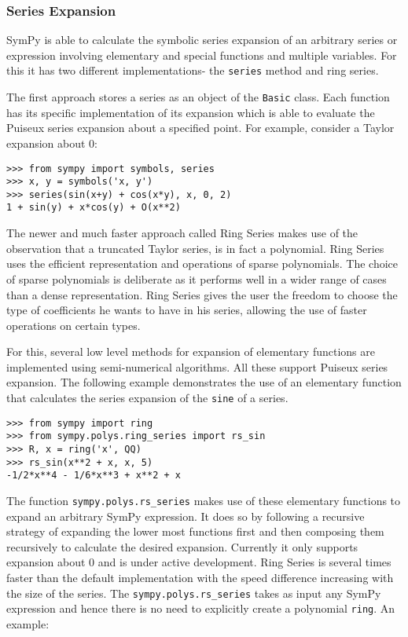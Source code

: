 \subsubsection{Series Expansion}

SymPy is able to calculate the symbolic series expansion of an arbitrary series
or expression involving elementary and special functions and multiple
variables. For this it has two different implementations- the \texttt{series}
method and ring series.

The first approach stores a series as an object of the \texttt{Basic} class.
Each function has its specific implementation of its expansion which is able to
evaluate the Puiseux series expansion about a specified point. For example,
consider a Taylor expansion about 0:

\begin{verbatim}
>>> from sympy import symbols, series
>>> x, y = symbols('x, y')
>>> series(sin(x+y) + cos(x*y), x, 0, 2)
1 + sin(y) + x*cos(y) + O(x**2)
\end{verbatim}

The newer and much faster approach called Ring Series makes use of the
observation that a truncated Taylor series, is in fact a polynomial.
Ring Series uses the efficient representation and operations of sparse
polynomials. The choice of sparse polynomials is deliberate as it performs
well in a wider range of cases than a dense representation. Ring Series gives 
the user the freedom to choose the type of coefficients he wants to have in
his series, allowing the use of faster operations on certain types.

For this, several low level methods for expansion of elementary functions are
implemented using semi-numerical algorithms. All these support Puiseux series
expansion. The following example demonstrates the use of an elementary
function that calculates the series expansion of the \texttt{sine} of a series.

\begin{verbatim}
>>> from sympy import ring
>>> from sympy.polys.ring_series import rs_sin
>>> R, x = ring('x', QQ)
>>> rs_sin(x**2 + x, x, 5)
-1/2*x**4 - 1/6*x**3 + x**2 + x
\end{verbatim}

The function \texttt{sympy.polys.rs\_series} makes use of these elementary
functions to expand an arbitrary SymPy expression. It does so by following a
recursive strategy of expanding the lower most functions first and then
composing them recursively to calculate the desired expansion. Currently it
only supports expansion about 0 and is under active development. Ring Series
is several times faster than the default implementation with the speed
difference increasing with the size of the series. The
\texttt{sympy.polys.rs\_series} takes as input any SymPy expression and hence
there is no need to explicitly create a polynomial \texttt{ring}. An example:

